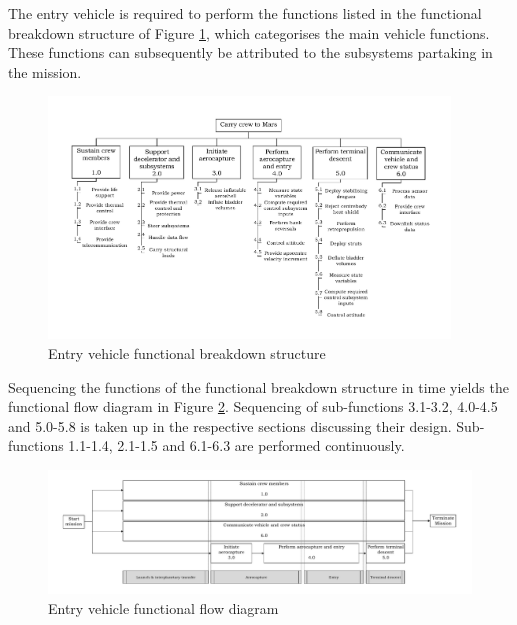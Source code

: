 The entry vehicle is required to perform the functions listed in the functional breakdown structure of Figure \ref{fig:fbs}, which categorises the main vehicle functions. These functions can subsequently be attributed to the subsystems partaking in the mission.

\begin{figure}[h]
	\includegraphics[width=0.95\textwidth]{./Figure/subsystem_breakdown/FBS.pdf}
	\caption{Entry vehicle functional breakdown structure}
	\label{fig:fbs}
\end{figure}

Sequencing the functions of the functional breakdown structure in time yields the functional flow diagram in Figure \ref{fig:ffd}. Sequencing of sub-functions 3.1-3.2, 4.0-4.5 and 5.0-5.8 is taken up in the respective sections discussing their design. Sub-functions 1.1-1.4, 2.1-1.5 and 6.1-6.3 are performed continuously.

\begin{figure}[H]
	\includegraphics[width=1.00\textwidth]{./Figure/subsystem_breakdown/FFD.pdf}
	\caption{Entry vehicle functional flow diagram}
	\label{fig:ffd}
\end{figure}



